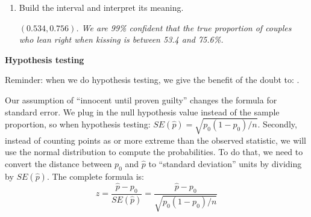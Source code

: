 \begin{enumerate}
\begin{enumerate}
\begin{enumerate}
\begin{key}
  {\it  0.645}
\end{key}
       \item What is the standard error of $\widehat{p}$ for these
         data?   
\begin{students}
        \vspace{.7cm}        
\end{students}

\begin{key}
  {\it  $\sqrt{0.645 * 0.355 / 124} = 0.0430 $}
\end{key}
       \item From the table about two pages back, what $z^*$ values
         goes with 99\% confidence?   
       \end{enumerate}
\begin{students}
        \vspace{.7cm}        
\end{students}

\begin{key}
  {\it  2.576}
\end{key}
       \item Build the interval and interpret its meaning. 
\begin{students}
        \newpage
\end{students}

\begin{key}
 {\it $(0.534, 0.756)$.  We are 99\% confident that the true
    proportion of couples who lean right when kissing is between 53.4
    and 75.6\%. }
\end{key}
     \end{enumerate}
   \end{enumerate}

   \begin{center}
     {\large\bf   Hypothesis testing }
   \end{center}

 Reminder:  when we do hypothesis testing, we give the benefit
 of the doubt to: \underline{\hspace{1in}}.

 Our assumption of ``innocent until proven guilty'' changes the
 formula for standard error.  We plug in the null hypothesis value
 instead of the sample proportion, so when hypothesis testing: $
 SE(\widehat{p}) = \sqrt{p_0(1-p_0)/n}$. Secondly, instead of counting
 points as or more extreme than the observed statistic, we will use
 the normal distribution to compute the probabilities.  To do that, we
 need to convert the distance between $p_0$ and $\widehat{p}$ to ``standard
 deviation'' units by dividing by $SE(\widehat{p})$.  The complete
 formula is:
  $$ z = \frac{\widehat{p} - p_0}{SE(\widehat{p})} = 
         \frac{\widehat{p} - p_0}{\sqrt{p_0(1-p_0)/n}}$$
   
